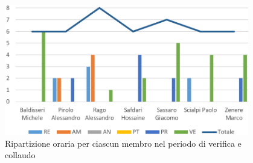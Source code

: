 \begin{figure}[!htb]   
    \centering
    \includegraphics[width=0.95\textwidth]{Images/prev10}
	\caption{Ripartizione oraria per ciascun membro nel periodo di verifica e collaudo}
\end{figure}

